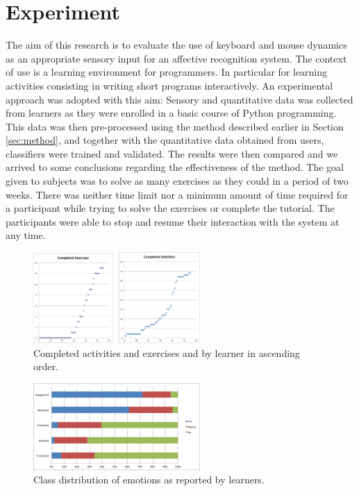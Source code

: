 \documentclass[conference]{IEEEtran}
\begin{document}
\section{Experiment}
\label{sec:exp}
The aim of this research is to evaluate the use of keyboard
and mouse dynamics as an appropriate sensory input for an affective recognition
system. The context of use is a learning environment for programmers. In
particular for learning activities consisting in writing short programs
interactively. An experimental approach was adopted with this aim: Sensory and
quantitative data was collected from learners as they were enrolled in a basic
course of Python programming. This data was then pre-processed using the method
described earlier in Section \ref{sec:method}, and together with the quantitative data obtained from users,
classifiers were trained and validated. The results were then compared
and we arrived to some conclusions regarding the effectiveness of the method. The goal given to
subjects was to solve as many exercises as they could in a period of two weeks.
There was neither time limit nor a minimum amount of time required for a
participant while trying to solve the exercises or complete the tutorial. The
participants were able to stop and resume their interaction with the system at
any time.




\begin{figure}[!t] 
\centering 
\includegraphics[width=2.5in]{Completed.png} 
\caption{Completed activities and exercises and by learner in ascending order.}
\label{fig_completed} 
\end{figure}

\begin{figure}[!t] 
\centering 
\includegraphics[width=2.5in]{classDist.png} 
\caption{Class distribution of emotions as reported by learners.}
\label{fig_class} 
\end{figure}
\end{document}
